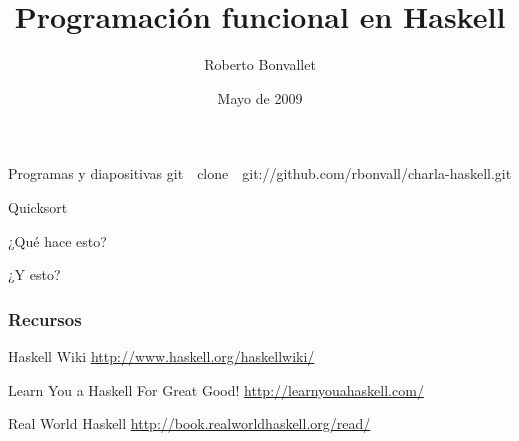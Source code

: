 \documentclass[12pt]{beamer}
\title {Programación funcional en Haskell}
\author{Roberto Bonvallet}
\institute[]{
    Departamento de Informática \\
    Universidad Técnica Federico Santa María
}
\date{Mayo de 2009}
\begin{document}
\begin{frame}
    \titlepage
\end{frame}

\begin{frame}
    \begin{block}{Programas y diapositivas}
        git~~clone~~git:/\!\!/github.com/rbonvall/charla-haskell.git
    \end{block}
\end{frame}
    
\begin{frame}[fragile]
    
\end{frame}

\begin{frame}[fragile]
    
\end{frame}

\begin{frame}[fragile]
    
\end{frame}

\begin{frame}[fragile]
    
\end{frame}

\begin{frame}[fragile]
    \begin{block}{Quicksort}
        
    \end{block}
\end{frame}

\begin{frame}[fragile]
    \begin{block}{¿Qué hace esto?}
        
    \end{block}
    \begin{block}{¿Y esto?}
        
    \end{block}
\end{frame}


\begin{frame}
    \frametitle{Recursos}
    \begin{thebibliography}{99}
        Haskell Wiki
        \newblock \url{http://www.haskell.org/haskellwiki/}

        Learn You a Haskell For Great Good!
        \newblock \url{http://learnyouahaskell.com/}

        Real World Haskell
        \newblock \url{http://book.realworldhaskell.org/read/}
    \end{thebibliography}
\end{frame}
\end{document}
